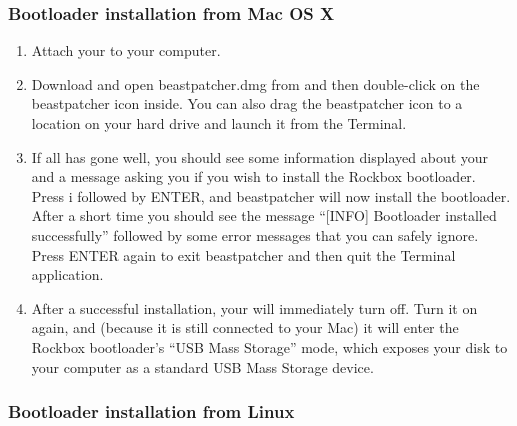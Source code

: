 \subsubsection{Bootloader installation from Mac OS X}
\begin{enumerate}
\item Attach your \dap{} to your computer.

\item Download and open beastpatcher.dmg from 
and then double-click on the beastpatcher icon inside. You can also
drag the beastpatcher icon to a location on your hard drive and launch
it from the Terminal.

\item If all has gone well, you should see some 
information displayed about your \dap{} and a message asking you if you 
wish to install the Rockbox bootloader. Press i followed by ENTER, and 
beastpatcher will now install the bootloader. After a short time you 
should see the message ``[INFO] Bootloader installed successfully''
followed by some error messages that you can safely ignore. Press 
ENTER again to exit beastpatcher and then quit the Terminal application.

\item After a successful installation, your \dap{} will immediately turn off.
Turn it on again, and (because it is still connected to your Mac)
it will enter the Rockbox bootloader's
``USB Mass Storage'' mode, which exposes your \daps{} disk to your computer
as a standard USB Mass Storage device.
\end{enumerate}

\subsubsection{Bootloader installation from Linux}

